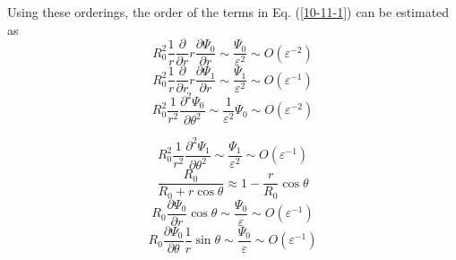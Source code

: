 \documentclass{article}
\begin{document}
Using these orderings, the order of the terms in Eq. (\ref{10-11-1}) can be
estimated as
\begin{equation}
  R_0^2 \frac{1}{r}  \frac{\partial}{\partial r} r \frac{\partial
  \Psi_0}{\partial r} \sim \frac{\Psi_0}{\varepsilon^2} \sim O (\varepsilon^{-
  2})
\end{equation}
\begin{equation}
  R_0^2 \frac{1}{r}  \frac{\partial}{\partial r} r \frac{\partial
  \Psi_1}{\partial r} \sim \frac{\Psi_1}{\varepsilon^2} \sim O (\varepsilon^{-
  1})
\end{equation}
\begin{equation}
  R_0^2 \frac{1}{r^2}  \frac{\partial^2 \Psi_0}{\partial \theta^2} \sim
  \frac{1}{\varepsilon^2} \Psi_0 \sim O (\varepsilon^{- 2})
\end{equation}

\begin{equation}
  R_0^2 \frac{1}{r^2}  \frac{\partial^2 \Psi_1}{\partial \theta^2} \sim
  \frac{\Psi_1}{\varepsilon^2} \sim O (\varepsilon^{- 1})
\end{equation}
\begin{equation}
  \frac{R_0}{R_0 + r \cos \theta} \approx 1 - \frac{r}{R_0} \cos \theta
\end{equation}
\begin{equation}
  R_0  \frac{\partial \Psi_0}{\partial r} \cos \theta \sim
  \frac{\Psi_0}{\varepsilon} \sim O (\varepsilon^{- 1})
\end{equation}
\begin{equation}
  R_0  \frac{\partial \Psi_0}{\partial \theta}  \frac{1}{r} \sin \theta \sim
  \frac{\Psi_0}{\varepsilon} \sim O (\varepsilon^{- 1})
\end{equation}
\end{document}

